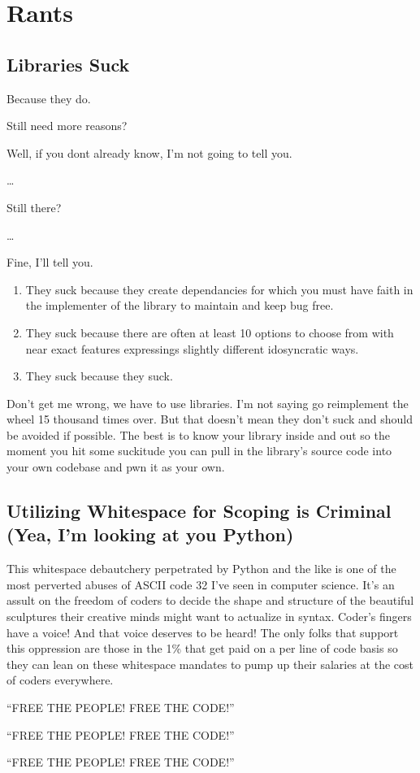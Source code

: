 \chapter{Rants}

\section{Libraries Suck}
\label{rant:librariessuck}
\par
Because they do.
\par
Still need more reasons?
\par
Well, if you dont already know, I'm not going to tell you.
\par
\dots
\par
Still there?
\par
\dots
\par
Fine, I'll tell you.
\begin{enumerate}
    \item They suck because they create dependancies for which you must have faith in the implementer of the library to maintain and keep bug free.
    \item They suck because there are often at least 10 options to choose from with near exact features expressings slightly different idosyncratic ways.
    \item They suck because they suck.
\end{enumerate}
Don't get me wrong, we have to use libraries. I'm not saying go reimplement the wheel 15 thousand times over. But that doesn't mean they don't suck and should be avoided if possible. The best is to know your library inside and out so the moment you hit some suckitude you can pull in the library's source code into your own codebase and \gls{pwn} it as your own.

\section{Utilizing Whitespace for Scoping is Criminal (Yea, I'm looking at you Python)}
\label{rant:whitespacesucks}
\par
This whitespace debautchery perpetrated by Python and the like is one of the most perverted abuses of ASCII code 32 I've seen in computer science. It's an assult on the freedom of coders to decide the shape and structure of the beautiful sculptures their creative minds might want to actualize in syntax. Coder's fingers have a voice! And that voice deserves to be heard! The only folks that support this oppression are those in the 1\% that get paid on a per line of code basis so they can lean on these whitespace mandates to pump up their salaries at the cost of coders everywhere.
\par
``FREE THE PEOPLE! FREE THE CODE!''
\par
``FREE THE PEOPLE! FREE THE CODE!''
\par
``FREE THE PEOPLE! FREE THE CODE!''